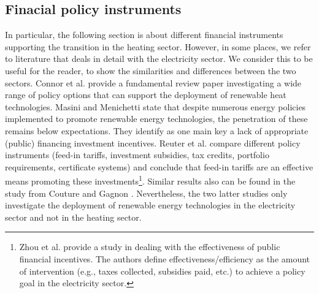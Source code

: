 \subsection{Finacial policy instruments}\label{aspect3}
In particular, the following section is about different financial instruments supporting the transition in the heating sector. However, in some places, we refer to literature that deals in detail with the electricity sector. We consider this to be useful for the reader, to show the similarities and differences between the two sectors. Connor et al. \cite{connor2013devising} provide a fundamental review paper investigating a wide range of policy options that can support the deployment of renewable heat technologies. Masini and Menichetti \cite{masini2012impact} state that despite numerous energy policies implemented to promote renewable energy technologies, the penetration of these remains below expectations. They identify as one main key a lack of appropriate (public) financing investment incentives. Reuter et al. \cite{reuter2012renewable} compare different policy instruments (feed-in tariffs, investment subsidies, tax credits, portfolio requirements, certificate systems) and conclude that feed-in tariffs are an effective means promoting these investments\footnote{Zhou et al. \cite{zhou2011designing} provide a study in dealing with the effectiveness of public financial incentives. The authors define effectiveness/efficiency as the amount of intervention (e.g., taxes collected, subsidies paid, etc.) to achieve a policy goal in the electricity sector.}. Similar results also can be found in the study from Couture and Gagnon \cite{couture2010analysis}. Nevertheless, the two latter studies only investigate the deployment of renewable energy technologies in the electricity sector and not in the heating sector.\vspace{0.5cm} 

